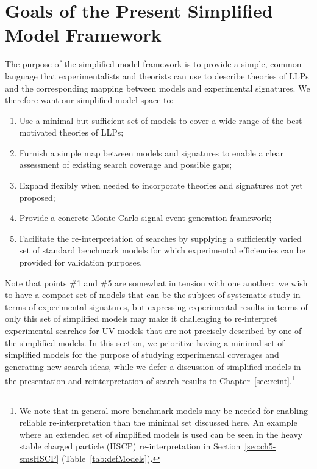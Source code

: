 \section{Goals of the Present Simplified Model Framework}\label{sec:goals}

The purpose of the simplified model framework is to provide a simple, common language that experimentalists and theorists can use to describe theories of LLPs and the corresponding mapping between models and experimental signatures. We therefore want our simplified model space to:
%
\begin{enumerate}
%
\item  Use a minimal but sufficient set of models to cover a wide range of the best-motivated theories of LLPs;
\item  Furnish a simple map between models and signatures to enable a clear assessment of existing search coverage and possible gaps; 
\item Expand flexibly when needed to incorporate theories and signatures not yet proposed;
\item Provide a concrete Monte Carlo signal event-generation framework;
\item Facilitate the re-interpretation of searches by supplying a sufficiently varied set of standard benchmark models for which experimental efficiencies can be provided for validation purposes.
\end{enumerate}
%
Note that points \#1 and \#5 are somewhat in tension with one another:~we wish to have a compact set of models that can be the subject of systematic study in terms of experimental signatures, but expressing experimental results in terms of only this set of simplified models may make it challenging to re-interpret experimental searches for UV models that are not precisely described by one of the simplified models. In this section, we prioritize having a minimal set of simplified models for the purpose of studying experimental coverages and generating new search ideas, while we defer a discussion of simplified models in the presentation and
reinterpretation of search results to Chapter~\ref{sec:reint}.\footnote{We note that in general more benchmark models may be needed for enabling reliable re-interpretation than the minimal set discussed here. An example where an extended set of simplified models is used can be seen in the heavy stable charged particle (HSCP) re-interpretation in Section~\ref{sec:ch5-smsHSCP} (Table~\ref{tab:defModels}).}

